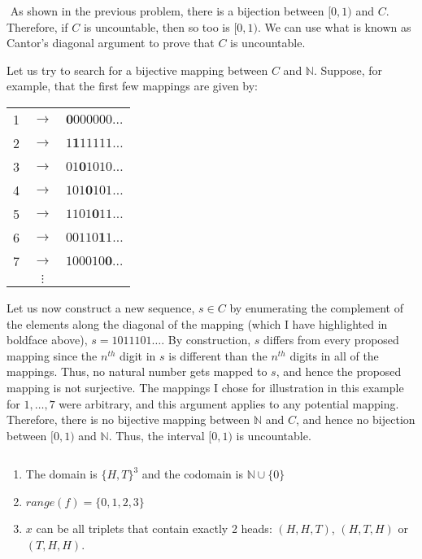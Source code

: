   
    \begin{problem}{11} $ $
 As shown in the previous problem, there is a bijection between $[0, 1)$ and $C$.  Therefore, if $C$ is uncountable, then so too is $[0, 1)$.  We can use what is known as Cantor's diagonal argument to prove that $C$ is uncountable.
 
 Let us try to search for a bijective mapping between $C$ and $\mathbb N$.  Suppose, for example, that the first few mappings are given by:
 \\

 \begin{tabular}{ c c c }
1 & $\rightarrow$ & $\mathbf{0} 000000\ldots$ \\
2 & $\rightarrow$& $1\mathbf{1}11111\ldots$\\
3 & $\rightarrow$& $01 \mathbf{0}1010\ldots$\\
4& $\rightarrow$ &$101\mathbf{0}101\ldots$\\
5 & $\rightarrow$&$1101\mathbf{0}11\ldots$\\
6& $\rightarrow$&$00110\mathbf{1}1\ldots$\\
7 &$\rightarrow$& $100010\mathbf{0}\ldots$ \\
& $\vdots$&  
 \end{tabular}


Let us now construct a new sequence, $s \in C$ by enumerating the complement of the elements along the diagonal of the mapping (which I have highlighted in boldface above), $s = 1011101 \ldots$.  By construction, $s$ differs from every proposed mapping since the $n^{th}$ digit in $s$ is different than the $n^{th}$ digits in all of the mappings.   Thus, no natural number gets mapped to $s$, and hence the proposed mapping is not surjective.  The mappings I chose for illustration in this example for $1, \ldots, 7$ were arbitrary, and this argument applies to any potential mapping.  Therefore, there is no bijective mapping between $\mathbb N$ and $C$, and hence no bijection between $[0, 1)$ and $\mathbb N$.  Thus, the interval $[0, 1)$ is uncountable.
 
 
  \end{problem}
  
\begin{problem}{12} $ $
	\begin{enumerate}
		
		\item The domain is $\{ H, T \}^3$ and the codomain is $\mathbb N \cup \{ 0 \}$
		
		\item $range(f) = \{0, 1, 2, 3\}$
		
		\item $x$ can be all triplets that contain exactly 2 heads: $(H, H, T)$, $(H, T, H)$ or $(T, H, H)$.
  
 	\end{enumerate}
\end{problem} 


